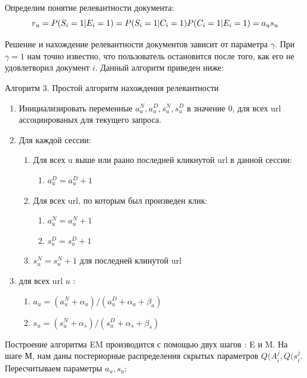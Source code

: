 Определим понятие релевантности документа:
\begin{equation}
	r_u=P(S_i=1|E_i=1)\\
	   =P(S_i=1|C_i=1)P(C_i=1|E_i=1)\\
	   =a_u s_u
\end{equation}


Решение и нахождение релевантности документов зависит от параметра $\gamma$. При $\gamma =1$ нам точно известно, что пользователь остановится после того, как его не удовлетворил документ $i$. Данный алгоритм приведен ниже:

\begin{algorithm}
  \caption{Алгоритм 3. Простой алгоритм нахождения релевантности}
  \label{overall-boosting-algorithm}
  \begin{enumerate}
  \item Инициализировать переменные $a_{u}^{N},a_{u}^{D},s_{u}^{N},s_{u}^{D}$ в значение 0, для всех url ассоциированых для текущего запроса.
  \item Для каждой сессии:
    \begin{enumerate}
      \item Для всех u выше или раано последней кликнутой url в данной сессии:
      	\begin{enumerate}
      		\item $a_{u}^{D}=a_{u}^{D}+1$
      	\end{enumerate}
      \item Для всех url, по которым был произведен клик:
      	\begin{enumerate}
      		\item $a_{u}^{N}=a_{u}^{N}+1$
      		\item $s_{u}^{D}=s_{u}^{D}+1$
      	\end{enumerate}
      \item $s_{u}^{N}=s_{u}^{N}+1$ для последней клинутой url
    \end{enumerate}
    \item для всех url $u$ :
    	\begin{enumerate}
    		\item $a_u=(a_{u}^{N}+\alpha_a)/(a_{u}^{D}+\alpha_a+\beta_a)$
    		\item $s_u=(s_{u}^{N}+\alpha_s)/(s_{u}^{D}+\alpha_s+\beta_s)$
    	\end{enumerate}
  \end{enumerate}
\end{algorithm}

Построение алгоритма EM производится с помощью двух шагов : E и M.
На шаге М, нам даны постериорные распределения скрытых параметров $Q(A_{i}^{j},Q(s_{i}^{j}$. Пересчитываем параметры $a_u,s_u$:

